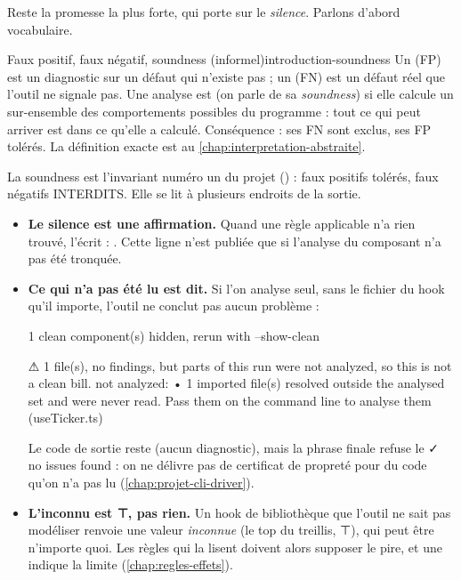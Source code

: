 Reste la promesse la plus forte, qui porte sur le \emph{silence}. Parlons
d'abord vocabulaire.

\begin{definition}{Faux positif, faux négatif, soundness (informel)}{introduction-soundness}
  Un  (FP) est un diagnostic sur un défaut qui n'existe
  pas ; un  (FN) est un défaut réel que l'outil ne signale
  pas. Une analyse est  (on parle de sa \emph{soundness}) si elle
  calcule un sur-ensemble des comportements possibles du programme : tout ce
  qui peut arriver est dans ce qu'elle a calculé. Conséquence : ses FN sont
  exclus, ses FP tolérés. La définition exacte est au
  \cref{chap:interpretation-abstraite}.
\end{definition}

La soundness est l'invariant numéro un du projet () : \og faux
positifs tolérés, faux négatifs INTERDITS\fg{}. Elle se lit à plusieurs
endroits de la sortie.
\begin{itemize}
  \item \textbf{Le silence est une affirmation.} Quand une règle applicable
    n'a rien trouvé,  l'écrit : . Cette ligne n'est
    publiée que si l'analyse du composant n'a pas été tronquée.
  \item \textbf{Ce qui n'a pas été lu est dit.} Si l'on analyse
     seul, sans le fichier du hook qu'il
    importe, l'outil ne conclut pas \og aucun problème\fg{} :
\begin{sortie}
   1 clean component(s) hidden, rerun with --show-clean

⚠  1 file(s), no findings, but parts of this run were not analyzed, so this is not a clean bill.
   not analyzed:
     • 1 imported file(s) resolved outside the analysed set and were never read. Pass them on the command line to analyse them (useTicker.ts)
\end{sortie}
    Le code de sortie reste  (aucun diagnostic), mais la phrase finale
    refuse le \og ✓ no issues found\fg{} : on ne délivre pas de certificat de
    propreté pour du code qu'on n'a pas lu (\cref{chap:projet-cli-driver}).
  \item \textbf{L'inconnu est ⊤, pas \og rien\fg{}.} Un hook de bibliothèque
    que l'outil ne sait pas modéliser renvoie une valeur \emph{inconnue} (le
    top du treillis, ⊤), qui peut être n'importe quoi. Les règles qui la lisent
    doivent alors supposer le pire, et une \Info{} 
    indique la limite (\cref{chap:regles-effets}).
\end{itemize}

